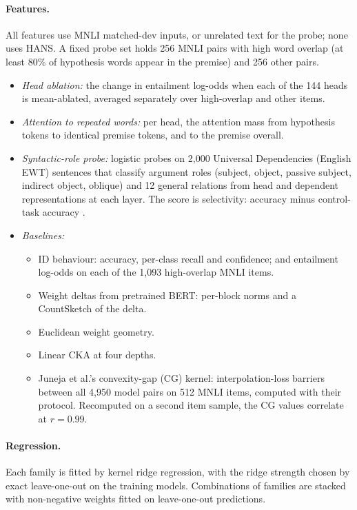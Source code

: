 \documentclass[10pt]{article}
\begin{document}
\paragraph{Features.} All features use MNLI matched-dev inputs, or unrelated text for the probe; none uses HANS. A fixed probe set holds 256 MNLI pairs with high word overlap (at least 80\% of hypothesis words appear in the premise) and 256 other pairs.
\begin{itemize}\itemsep0pt
\item \emph{Head ablation:} the change in entailment log-odds when each of the 144 heads is mean-ablated, averaged separately over high-overlap and other items.
\item \emph{Attention to repeated words:} per head, the attention mass from hypothesis tokens to identical premise tokens, and to the premise overall.
\item \emph{Syntactic-role probe:} logistic probes on 2{,}000 Universal Dependencies (English EWT) sentences that classify argument roles (subject, object, passive subject, indirect object, oblique) and 12 general relations from head and dependent representations at each layer. The score is selectivity: accuracy minus control-task accuracy \citep{hewitt2019}.
\item \emph{Baselines:}
  \begin{itemize}\itemsep0pt
  \item ID behaviour: accuracy, per-class recall and confidence; and entailment log-odds on each of the 1{,}093 high-overlap MNLI items.
  \item Weight deltas from pretrained BERT: per-block norms and a CountSketch of the delta.
  \item Euclidean weight geometry.
  \item Linear CKA \citep{kornblith2019} at four depths.
  \item Juneja et al.'s convexity-gap (CG) kernel: interpolation-loss barriers between all 4{,}950 model pairs on 512 MNLI items, computed with their protocol. Recomputed on a second item sample, the CG values correlate at $r=0.99$.
  \end{itemize}
\end{itemize}

\paragraph{Regression.} Each family is fitted by kernel ridge regression, with the ridge strength chosen by exact leave-one-out on the training models. Combinations of families are stacked with non-negative weights fitted on leave-one-out predictions.
\end{document}
